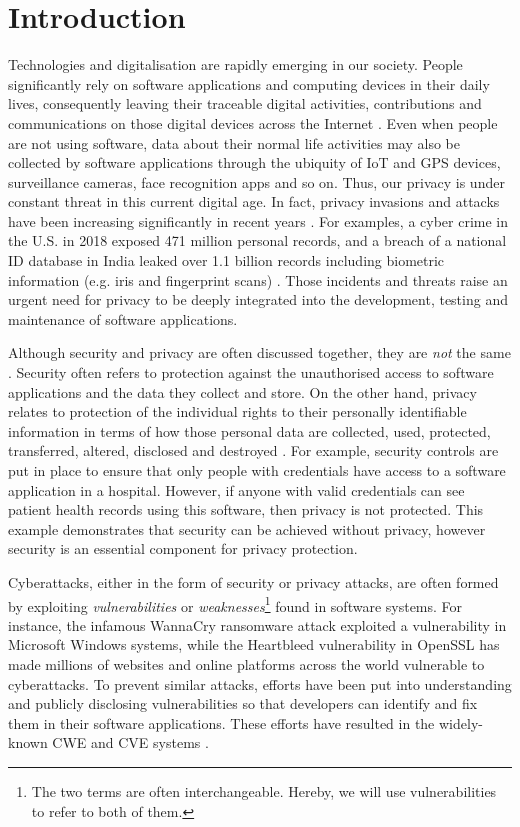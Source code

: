 \section{Introduction} \label{sec:intro}

Technologies and digitalisation are rapidly emerging in our society. People significantly rely on software applications and computing devices in their daily lives, consequently leaving their traceable digital activities, contributions and communications on those digital devices across the Internet \cite{Statista2021b}. Even when people are not using software, data about their normal life activities may also be collected by software applications through the ubiquity of IoT and GPS devices, surveillance cameras, face recognition apps and so on. Thus, our privacy is under constant threat in this current digital age. In fact, privacy invasions and attacks have been increasing significantly in recent years \cite{Statista, OAIC2021}. For examples, a cyber crime in the U.S. in 2018 exposed 471 million personal records, and a breach of a national ID database in India leaked over 1.1 billion records including biometric information (e.g. iris and fingerprint scans) \cite{Statista2021}. Those incidents and threats raise an urgent need for privacy to be deeply integrated into the development, testing and maintenance of software applications.

Although security and privacy are often discussed together, they are \emph{not} the same \cite{Bambauer2013}. Security often refers to protection against the unauthorised access to software applications and the data they collect and store. On the other hand, privacy relates to protection of the individual rights to their personally identifiable information in terms of how those personal data are collected, used, protected, transferred, altered, disclosed and destroyed \cite{ISO/IEC2011}. For example, security controls are put in place to ensure that only people with credentials have access to a software application in a hospital. However, if anyone with valid credentials can see patient health records using this software, then privacy is not protected. This example demonstrates that security can be achieved without privacy, however security is an essential component for privacy protection.

Cyberattacks, either in the form of security or privacy attacks, are often formed by exploiting \emph{vulnerabilities} or \emph{weaknesses}\footnote{The two terms are often interchangeable. Hereby, we will use vulnerabilities to refer to both of them.} found in software systems. For instance, the infamous WannaCry ransomware attack exploited a vulnerability in Microsoft Windows systems, while the Heartbleed vulnerability in OpenSSL has made millions of websites and online platforms across the world vulnerable to cyberattacks. To prevent similar attacks, efforts have been put into understanding and publicly disclosing vulnerabilities so that developers can identify and fix them in their software applications. These efforts have resulted in the widely-known CWE and CVE systems \cite{CWE, CVE}.

